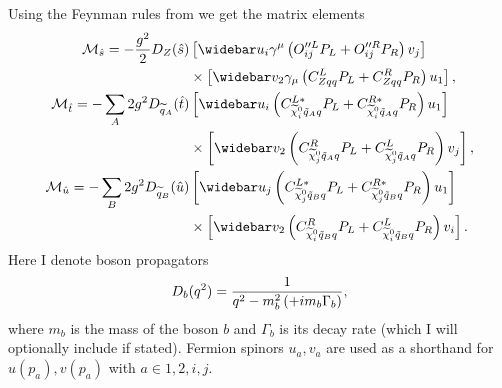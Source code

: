 \documentclass[english,notitlepage]{article}
\begin{document}
    Using the Feynman rules from  we get the matrix elements
    \begin{subequations}
        \begin{align}
            \nonumber
            \M_{\hat{s}} = -\frac{g^2}{2} D_Z(\hat{s})            & \bclosed{ \wbar{u}_i\gamma^\mu\pclosed{O^{\prime\prime L}_{ij}P_L + O^{\prime\prime R}_{ij}P_R} v_j }           \\
                                                                  & \times \bclosed{ \wbar{v}_2 \gamma_\mu \pclosed{C^L_{Zqq}P_L + C^R_{Zqq}P_R} u_1 },                             \\
            \nonumber
            \M_{\hat{t}} = -\sum_A 2g^2 D_{\wtilde{q}_A}(\hat{t}) & \bclosed{ \wbar{u}_i \pclosed{C_{\nino[i]\tilde{q}_Aq}^{L\ast}P_L + C_{\nino[i]\tilde{q}_Aq}^{R\ast} P_R} u_1 } \\
                                                                  & \times \bclosed{ \wbar{v}_2 \pclosed{C^R_{\nino[j]\tilde{q}_Aq}P_L + C^L_{\nino[j]\tilde{q}_Aq}P_R} v_j },      \\
            \nonumber
            \M_{\hat{u}} = -\sum_B 2g^2 D_{\wtilde{q}_B}(\hat{u}) & \bclosed{ \wbar{u}_j \pclosed{C_{\nino[j]\tilde{q}_Bq}^{L\ast}P_L + C_{\nino[j]\tilde{q}_Bq}^{R\ast} P_R} u_1 } \\
                                                                  & \times \bclosed{ \wbar{v}_2 \pclosed{C^R_{\nino[i]\tilde{q}_Bq}P_L + C^L_{\nino[i]\tilde{q}_Bq}P_R} v_i }.
        \end{align}
    \end{subequations}
    Here I denote boson propagators
    \[
        D_b(q^2) = \frac{1}{q^2 - m_b^2 \left(+ i m_b \Gamma_b\right)},
    \]
    where \(m_b\) is the mass of the boson \(b\) and \(\Gamma_b\) is its decay rate (which I will optionally include if stated).
    Fermion spinors \(u_a, v_a\) are used as a shorthand for \(u(p_a), v(p_a)\) with \(a \in 1, 2, i, j\).
\end{document}
